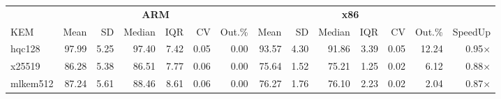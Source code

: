 \begin{table}[!ht]
\centering
\begin{tabular}{l|rrrrrr|rrrrrr|r}
\toprule
& \multicolumn{6}{c}{\bfseries ARM} & \multicolumn{6}{c}{\bfseries x86} & \\
\cmidrule(lr){2-7} \cmidrule(lr){8-13}
KEM & Mean & SD & Median & IQR & CV & Out.\% & Mean & SD & Median & IQR & CV & Out.\% & SpeedUp \\
\midrule
hqc128 & 97.99 & 5.25 & 97.40 & 7.42 & 0.05 & 0.00 & 93.57 & 4.30 & 91.86 & 3.39 & 0.05 & 12.24 & 0.95× \\
x25519 & 86.28 & 5.38 & 86.51 & 7.77 & 0.06 & 0.00 & 75.64 & 1.52 & 75.21 & 1.25 & 0.02 & 6.12 & 0.88× \\
mlkem512 & 87.24 & 5.61 & 88.46 & 8.61 & 0.06 & 0.00 & 76.27 & 1.76 & 76.10 & 2.23 & 0.02 & 2.04 & 0.87× \\
\bottomrule
\end{tabular}
\end{table}
